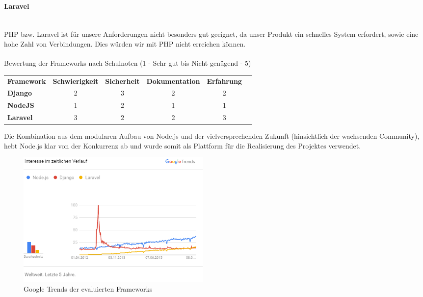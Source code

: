 \paragraph{Laravel} \mbox{}\\
\gls{PHP} bzw. Laravel ist f\"ur unsere Anforderungen nicht besonders gut geeignet, da unser Produkt ein schnelles System erfordert, sowie eine hohe Zahl von Verbindungen. Dies w\"urden wir mit \gls{PHP} nicht erreichen k\"onnen.
\\ \mbox{} \\
Bewertung der Frameworks nach Schulnoten (1 - Sehr gut bis Nicht genügend - 5)

\begin{table}[ht]
\centering
\begin{tabular}{|l|c|c|c|c|l}
\cline{1-5}
\textbf{Framework} & \multicolumn{1}{l|}{\textbf{Schwierigkeit}} & \multicolumn{1}{l|}{\textbf{Sicherheit}} & \multicolumn{1}{l|}{\textbf{Dokumentation}} & \multicolumn{1}{l|}{\textbf{Erfahrung}} & \\ \cline{1-5}
\textbf{Django}    & 2                                         & 3                                      & 2                                         & 2                                     & \\ \cline{1-5}
\textbf{NodeJS}    & 1                                         & 2                                      & 1                                         & 1                                     & \\ \cline{1-5}
\textbf{Laravel}   & 3                                         & 2                                      & 2                                         & 3                                     & \\ \cline{1-5}
\end{tabular}
\end{table}

Die Kombination aus dem modularen Aufbau von Node.js und der vielversprechenden Zukunft (hinsichtlich der wachsenden Community), hebt Node.js klar von der Konkurrenz
ab und wurde somit als Plattform für die Realisierung des Projektes verwendet.

\begin{figure}[ht]
    \centering
    \includegraphics[width=3.8in]{images/framework_trends}
    \caption{Google Trends der evaluierten Frameworks\cite{frameworks_trends}}
\end{figure}

